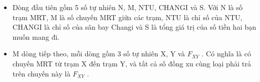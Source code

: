 \begin{itemize}
	\item     Dòng đầu tiên gồm 5 số tự nhiên N, M, NTU, CHANGI và S. Với N là số trạm MRT, M là số chuyến MRT giữa các trạm, NTU là chỉ số của NTU, CHANGI là chỉ số của sân bay Changi và S là tổng giá trị của số tiền hai bạn muốn mang đi.   
	\item     M dòng tiếp theo, mỗi dòng gồm 3 số tự nhiên X, Y và $F_{XY}$    . Có nghĩa là có chuyến MRT từ trạm X đến trạm Y, và tất cả số đồng xu cùng loại phải trả trên chuyến này là $F_{XY}$    .   
\end{itemize}